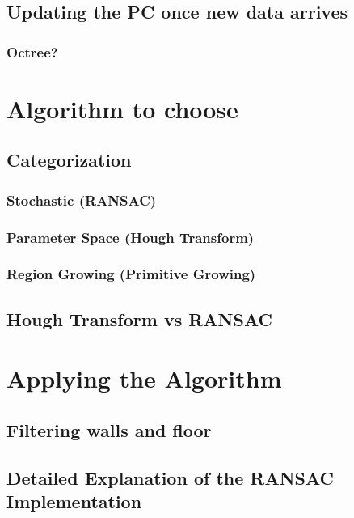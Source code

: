 \subsection{Updating the PC once new data arrives}

\subsubsection{Octree?}


\section{Algorithm to choose}

\subsection{Categorization}

\subsubsection{Stochastic (RANSAC)}

\subsubsection{Parameter Space (Hough Transform)}

\subsubsection{Region Growing (Primitive Growing)}

\subsection{Hough Transform vs RANSAC}


\section{Applying the Algorithm}

\subsection{Filtering walls and floor}

\subsection{Detailed Explanation of the RANSAC Implementation}
\parencite{schnabel_efficient_2007}


